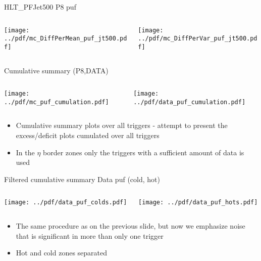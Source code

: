 \documentclass[9pt]{beamer}
\begin{document}
\begin{frame}[t]{HLT\_PFJet500 P8 puf}
\begin{columns}[T]
  \begin{column}{.5\textwidth}
  \texttt{[image: ../pdf/mc\_DiffPerMean\_puf\_jt500.pdf]}
  \end{column}
  \begin{column}{.5\textwidth}
  \texttt{[image: ../pdf/mc\_DiffPerVar\_puf\_jt500.pdf]}
  \end{column}
\end{columns}
\end{frame}

\begin{frame}[t]{Cumulative summary (P8,DATA)}
\begin{columns}[T]
  \begin{column}{.5\textwidth}
  \texttt{[image: ../pdf/mc\_puf\_cumulation.pdf]}
  \end{column}
  \begin{column}{.5\textwidth}
  \texttt{[image: ../pdf/data\_puf\_cumulation.pdf]}
  \end{column}
\end{columns}
\begin{itemize}
 \item Cumulative summary plots over all triggers - attempt to present the excess/deficit plots cumulated over all triggers
 \item In the $\eta$ border zones only the triggers with a sufficient amount of data is used
\end{itemize}
\end{frame}

\begin{frame}[t]{Filtered cumulative summary Data puf (cold, hot)}
\begin{columns}[T]
  \begin{column}{.5\textwidth}
  \texttt{[image: ../pdf/data\_puf\_colds.pdf]}
  \end{column}
  \begin{column}{.5\textwidth}
  \texttt{[image: ../pdf/data\_puf\_hots.pdf]}
  \end{column}
\end{columns}
\begin{itemize}
 \item The same procedure as on the previous slide, but now we emphasize noise that is significant in more than only one trigger
 \item Hot and cold zones separated
\end{itemize}
\end{frame}
\end{document}
